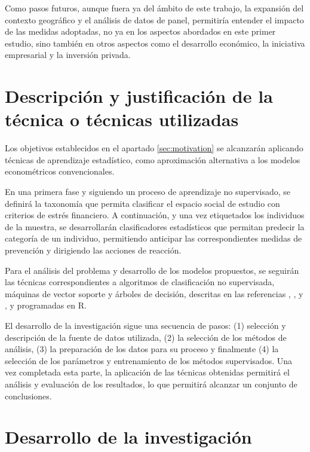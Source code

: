 \documentclass[a4paper, 11pt]{article}
\begin{document}
Como pasos futuros, aunque fuera ya del ámbito de este trabajo, la expansión del contexto
geográfico y el análisis de datos de panel, permitiría entender el impacto de las medidas 
adoptadas, no ya en los aspectos abordados en este primer estudio, sino también en otros 
aspectos como el desarrollo económico, la iniciativa empresarial y la inversión privada. 

\section{Descripción y justificación de la técnica o técnicas utilizadas}
\label{sec:technical_proposal}
Los objetivos establecidos en el apartado \ref{sec:motivation} se alcanzarán aplicando técnicas 
de aprendizaje estadístico, como aproximación alternativa a los modelos econométricos 
convencionales. 

En una primera fase y siguiendo un proceso de aprendizaje no supervisado, se definirá la taxonomía que permita clasificar el espacio social de estudio con criterios de estrés
financiero. A continuación, y una vez etiquetados los individuos de la muestra, se
desarrollarán clasificadores estadísticos que permitan predecir la categoría de un 
individuo, permitiendo anticipar las correspondientes medidas de prevención y dirigiendo las 
acciones de reacción. 

Para el análisis del problema y desarrollo de los modelos propuestos, se seguirán las 
técnicas correspondientes a algoritmos de clasificación no supervisada, máquinas de vector 
soporte y árboles de decisión, descritas en las referencias \cite{lantz23}, \cite{Hastie23}, 
\cite{aurelien17} y \cite{Hastie13}, y programadas en R\cite{R24}.

El desarrollo de la investigación sigue una secuencia de pasos: (1) selección y descripción 
de la fuente de datos utilizada, (2) la selección de los métodos de análisis, (3) la 
preparación de los datos para su proceso y finalmente (4) la selección de los parámetros y 
entrenamiento de los métodos supervisados. Una vez completada esta parte, la aplicación de
las técnicas obtenidas permitirá el análisis y evaluación de los resultados, lo que permitirá
alcanzar un conjunto de conclusiones.

\section{Desarrollo de la investigación}
\label{sec:research}
\end{document}
